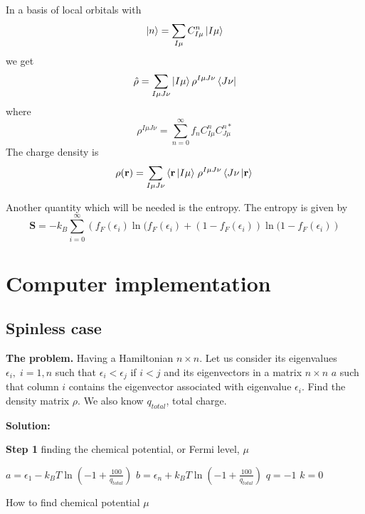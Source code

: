 \par{In a basis of local orbitals with}
\begin{equation}
\mathinner{|{n}\rangle}=\sum_{I\mu}C_{I\mu}^{n}\mathinner{|{I\mu}\rangle}
\end{equation}
we get
\begin{equation}
\hat{\rho}=\sum_{I\mu J\nu}\mathinner{|{I\mu}\rangle}\rho^{I\mu J\nu}\mathinner{\langle{J \nu}|}
\end{equation}
where
\begin{equation}
\rho^{I\mu J\nu}=\sum_{n=0}^{\infty}f_nC_{I\mu}^{n}C_{J\mu}^{n*}
\end{equation}
The charge density is
\begin{equation}
\rho({\bf r})=\sum_{I\mu J\nu}\left\langle {\bf r} \left\vert I\mu \right\rangle\right.\rho^{I\mu J\nu}\left\langle J \nu \left\vert {\bf r} \right\rangle\right.
\end{equation}
\par{Another quantity which will be needed is the entropy. The entropy is given by}
\begin{equation}
\bm{S}=-k_B\sum_{i=0}^{\infty}\left(f_F(\epsilon_i)\ln(f_F(\epsilon_i)+(1-f_F(\epsilon_i))\ln(1-f_F(\epsilon_i)\right)
\end{equation}

\section{Computer implementation}
\subsection{Spinless case}
\label{spinless}
\par{{\bf The problem.} Having a Hamiltonian $n \times n$. Let us consider its eigenvalues
$\epsilon_i, \; i=1,n$ such that $\epsilon_i < \epsilon_j$ if $i<j$ and its eigenvectors 
in a matrix $n \times n$ $a$ such that column $i$ contains the eigenvector associated 
with eigenvalue $\epsilon_i$. Find the density matrix $\rho$. We also know $q_{total}$, total charge.
}
\par{{\bf Solution:}}
\par{{\bf Step 1} finding the chemical potential, or Fermi level, $\mu$}

\begin{algorithm}[H]
\label{fermilevel}
$a=\epsilon_1-k_BT\ln(-1+\frac{100}{q_{total}})$\;
$b=\epsilon_n+k_BT\ln(-1+\frac{100}{q_{total}})$\;
$q=-1$\;
$k=0$\;
\caption{How to find chemical potential $\mu$}
\end{algorithm}

